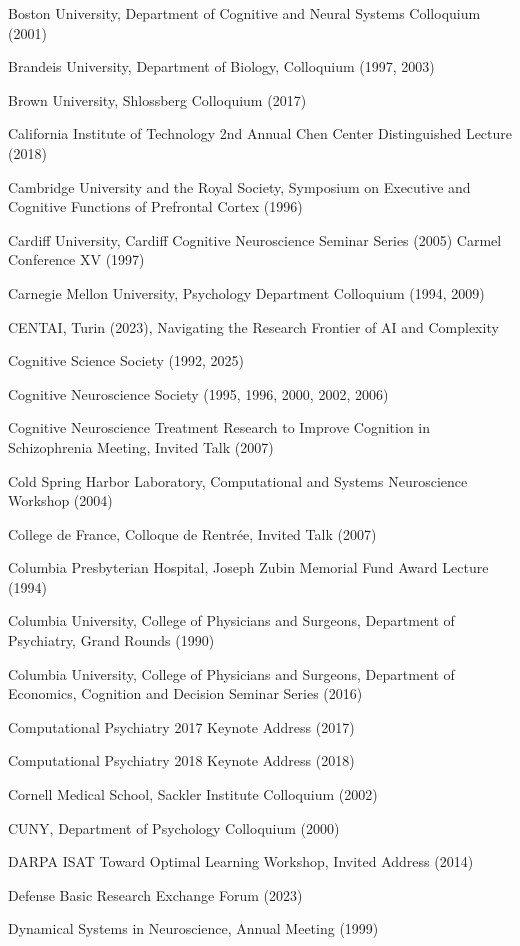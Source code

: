\documentclass[10 pt]{article}
\begin{document}
Boston University, Department of Cognitive and Neural Systems Colloquium (2001)

Brandeis University, Department of Biology, Colloquium (1997, 2003)

Brown University, Shlossberg Colloquium (2017)

California Institute of Technology 2nd Annual Chen Center Distinguished Lecture (2018)

Cambridge University and the Royal Society, Symposium on Executive and Cognitive Functions of Prefrontal Cortex (1996)

Cardiff University, Cardiff Cognitive Neuroscience Seminar Series (2005)
Carmel Conference XV (1997)

Carnegie Mellon University, Psychology Department Colloquium (1994, 2009)

CENTAI, Turin (2023), Navigating the Research Frontier of AI and Complexity

Cognitive Science Society (1992, 2025)

Cognitive Neuroscience Society (1995, 1996, 2000, 2002, 2006)

Cognitive Neuroscience Treatment Research to Improve Cognition in Schizophrenia Meeting, Invited Talk (2007)

Cold Spring Harbor Laboratory, Computational and Systems Neuroscience Workshop (2004)

College de France, Colloque de Rentrée, Invited Talk (2007)

Columbia Presbyterian Hospital, Joseph Zubin Memorial Fund Award Lecture (1994)

Columbia University, College of Physicians and Surgeons,
Department of Psychiatry, Grand Rounds (1990)

Columbia University, College of Physicians and Surgeons,
Department of Economics, Cognition and Decision Seminar Series (2016)

Computational Psychiatry 2017 Keynote Address (2017)

Computational Psychiatry 2018 Keynote Address (2018)

Cornell Medical School, Sackler Institute Colloquium (2002)

CUNY, Department of Psychology Colloquium (2000)

DARPA ISAT Toward Optimal Learning Workshop, Invited Address (2014)

Defense Basic Research Exchange Forum (2023)

Dynamical Systems in Neuroscience, Annual Meeting (1999)
\end{document}

